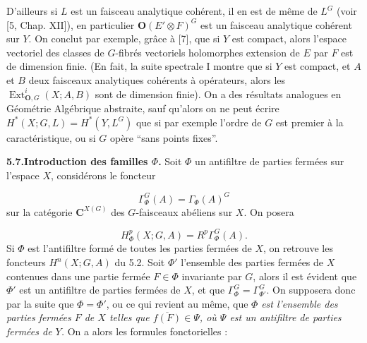 D'ailleurs si $L$ est un faisceau analytique cohérent, il en est de même de
$L^G$ (voir [5, Chap. XII]), en particulier ${\mathbf O}(E'\otimes F)^G$ est un faisceau
analytique cohérent sur $Y$.
On conclut par exemple, grâce à [7], que si $Y$ est compact, alors l'espace
vectoriel des classes de $G$-fibrés vectoriels holomorphes extension de $E$
par $F$ est de dimension finie. (En fait, la suite spectrale I montre que si
$Y$ est compact, et $A$ et $B$ deux faisceaux analytiques cohérents à
opérateurs, alors les $\operatorname{Ext}_{{\mathbf O},G}^{i}(X;A,B)$ sont de dimension
finie).
On a des résultats analogues en Géométrie Algébrique abstraite, sauf qu'alors
on ne peut écrire $H^*(X;G,L)=H^*(Y,L^G)$ que si par exemple l'ordre de $G$
est premier à la caractéristique, ou si $G$ opère ``sans points fixes''.

\textbf{5.7.\quad Introduction des familles $\Phi$.}
Soit $\Phi$ un antifiltre de parties fermées sur l'espace $X$, considérons le
foncteur

\begin{equation}
\Gamma_\Phi^G(A)=\Gamma_\Phi(A)^G
\tag{5.7.1}
\end{equation}
sur la catégorie ${\mathbf C}^{X(G)}$ des $G$-faisceaux abéliens sur $X$. On posera

\begin{equation}
H_\Phi^p(X;G,A)=R^p\Gamma_\Phi^G(A).
\tag{5.7.2}
\end{equation}
Si $\Phi$ est l'antifiltre formé de toutes les parties fermées de $X$, on
retrouve les foncteurs $H^n(X;G,A)$ du 5.2. Soit $\Phi'$ l'ensemble des
parties fermées de $X$ contenues dans une partie fermée $F\in\Phi$ invariante
par $G$, alors il est évident que $\Phi'$ est un antifiltre de parties fermées
de $X$, et que $\Gamma_\Phi^G=\Gamma_{\Phi'}^G$. On supposera donc par la suite
que $\Phi=\Phi'$, ou ce qui revient au même, que $\Phi$ \textit{est l'ensemble des
parties fermées $F$ de $X$ telles que $\overline{f(F)}\in\Psi$, où $\Psi$ est
un antifiltre de parties fermées de $Y$.}
On a alors les formules fonctorielles :

